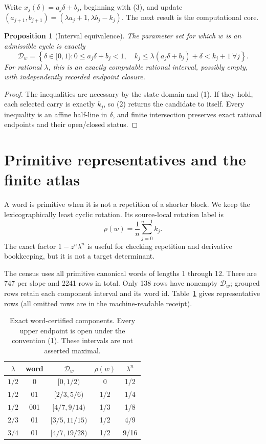 \documentclass[10pt]{article}
\newtheorem{proposition}{Proposition}
\begin{document}
Write \(x_j(\delta)=a_j\delta+b_j\), beginning with (3), and update
\((a_{j+1},b_{j+1})=(\lambda a_j+1,\lambda b_j-k_j)\).  The next result is
the computational core.
\begin{proposition}[Interval equivalence]
The parameter set for which \(w\) is an admissible cycle is exactly
\begin{equation}
 \mathcal D_w=\left\{\delta\in[0,1):
 0\leq a_j\delta+b_j<1,\quad
 k_j\leq\lambda(a_j\delta+b_j)+\delta<k_j+1\ \forall j\right\}. \tag{4}
\end{equation}
For rational \(\lambda\), this is an exactly computable rational interval,
possibly empty, with independently recorded endpoint closure.
\end{proposition}
\begin{proof}
The inequalities are necessary by the state domain and (1).  If they hold,
each selected carry is exactly \(k_j\), so (2) returns the candidate to itself.
Every inequality is an affine half-line in \(\delta\), and finite intersection
preserves exact rational endpoints and their open/closed status.
\end{proof}

\section{Primitive representatives and the finite atlas}
A word is primitive when it is not a repetition of a shorter block.  We keep
the lexicographically least cyclic rotation.  Its source-local rotation label
is
\begin{equation}
 \rho(w)=\frac{1}{n}\sum_{j=0}^{n-1}k_j. \tag{5}
\end{equation}
The exact factor \(1-z^n\lambda^n\) is useful for checking repetition and
derivative bookkeeping, but it is not a target determinant.

The census uses all primitive canonical words of lengths 1 through 12.  There
are 747 per slope and 2241 rows in total.  Only 138 rows have nonempty
\(\mathcal D_w\); grouped rows retain each component interval and its word id.
Table~\ref{tab:examples} gives representative rows (all omitted rows are in
the machine-readable receipt).
\begin{table}[t]
\centering
\caption{Exact word-certified components.  Every upper endpoint is open under
the convention (1).  These intervals are not asserted maximal.}
\label{tab:examples}
\begin{tabular}{ccccc}
\toprule
\(\lambda\) & word & \(\mathcal D_w\) & \(\rho(w)\) & \(\lambda^n\)\\
\midrule
\(1/2\) & 0 & \([0,1/2)\) & 0 & 1/2\\
\(1/2\) & 01 & \([2/3,5/6)\) & 1/2 & 1/4\\
\(1/2\) & 001 & \([4/7,9/14)\) & 1/3 & 1/8\\
\(2/3\) & 01 & \([3/5,11/15)\) & 1/2 & 4/9\\
\(3/4\) & 01 & \([4/7,19/28)\) & 1/2 & 9/16\\
\bottomrule
\end{tabular}
\end{table}
\end{document}
